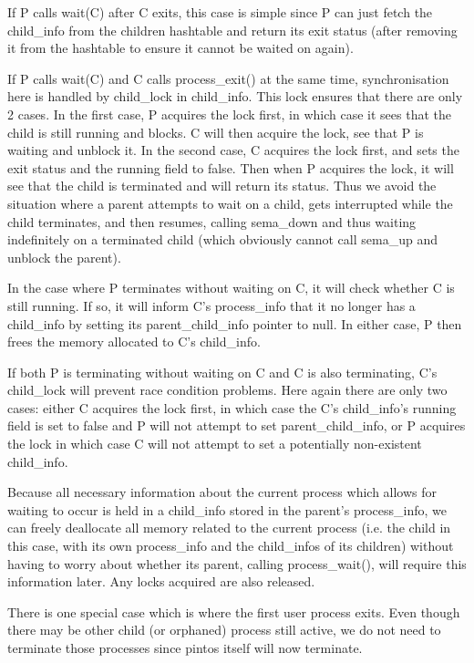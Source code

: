 If P calls wait(C) after C exits, this case is simple since P can just fetch the child\_info from the children hashtable and return its exit status (after removing it from the hashtable to ensure it cannot be waited on again).

If P calls wait(C) and C calls process\_exit() at the same time, synchronisation here is handled by child\_lock in child\_info. This lock ensures that there are only 2 cases. In the first case, P acquires the lock first, in which case it sees that the child is still running and blocks. C will then acquire the lock, see that P is waiting and unblock it. In the second case, C acquires the lock first, and sets the exit status and the running field to false. Then when P acquires the lock, it will see that the child is terminated and will return its status. Thus we avoid the situation where a parent attempts to wait on a child, gets interrupted while the child terminates, and then resumes, calling sema_down and thus waiting indefinitely on a terminated child (which obviously cannot call sema\_up and unblock the parent).

In the case where P terminates without waiting on C, it will check whether C is still running. If so, it will inform C's process\_info that it no longer has a child\_info by setting its parent\_child\_info pointer to null. In either case, P then frees the memory allocated to C's child\_info.

If both P is terminating without waiting on C and C is also terminating, C's child\_lock will prevent race condition problems. Here again there are only two cases: either C acquires the lock first, in which case the C's child\_info's running field is set to false and P will not attempt to set parent\_child\_info, or P acquires the lock in which case C will not attempt to set a potentially non-existent child\_info.

Because all necessary information about the current process which allows for waiting to occur is held in a child\_info stored in the parent's process\_info, we can freely deallocate all memory related to the current process (i.e. the child in this case, with its own process\_info and the child\_infos of its children) without having to worry about whether its parent, calling process\_wait(), will require this information later. Any locks acquired are also released.

There is one special case which is where the first user process exits. Even though there may be other child (or orphaned) process still active, we do not need to terminate those processes since pintos itself will now terminate.

